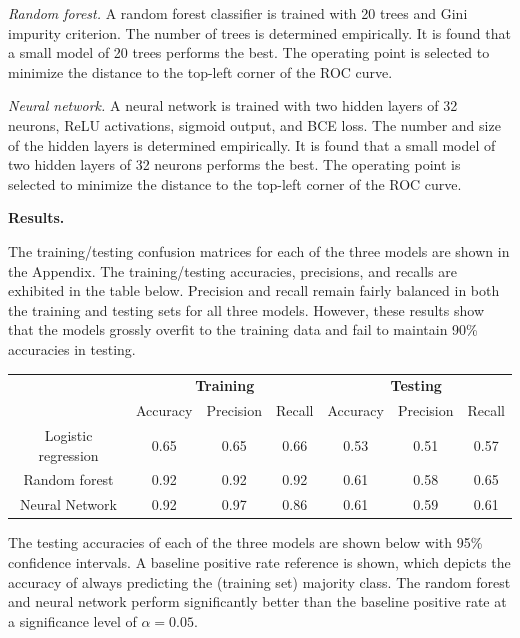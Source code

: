 \documentclass[12pt]{article}
\begin{document}
\textit{Random forest.} A random forest classifier is trained with 20 trees and Gini impurity criterion. The number of trees is determined empirically. It is found that a small model of 20 trees performs the best. The operating point is selected to minimize the distance to the top-left corner of the ROC curve.

\textit{Neural network.} A neural network is trained with two hidden layers of 32 neurons, ReLU activations, sigmoid output, and BCE loss. The number and size of the hidden layers is determined empirically. It is found that a small model of two hidden layers of 32 neurons performs the best. The operating point is selected to minimize the distance to the top-left corner of the ROC curve.

\textbf{Results.}

The training/testing confusion matrices for each of the three models are shown in the Appendix. The training/testing accuracies, precisions, and recalls are exhibited in the table below. Precision and recall remain fairly balanced in both the training and testing sets for all three models. However, these results show that the models grossly overfit to the training data and fail to maintain 90\% accuracies in testing.

\begin{center}
\begin{tabular}{c|ccc|ccc}
    & \multicolumn{3}{c|}{\textbf{Training}} & \multicolumn{3}{c}{\textbf{Testing}} \\ 
    & Accuracy & Precision & Recall & Accuracy & Precision & Recall \\ 
    \hline
    Logistic regression & 0.65 & 0.65 & 0.66 & 0.53 & 0.51 & 0.57 \\
    Random forest & 0.92 & 0.92 & 0.92 & 0.61 & 0.58 & 0.65 \\
    Neural Network & 0.92 & 0.97 & 0.86 & 0.61 & 0.59 & 0.61 \\
\end{tabular}
\end{center}

The testing accuracies of each of the three models are shown below with 95\% confidence intervals. A baseline positive rate reference is shown, which depicts the accuracy of always predicting the (training set) majority class. The random forest and neural network perform significantly better than the baseline positive rate at a significance level of $\alpha = 0.05$.
\end{document}
